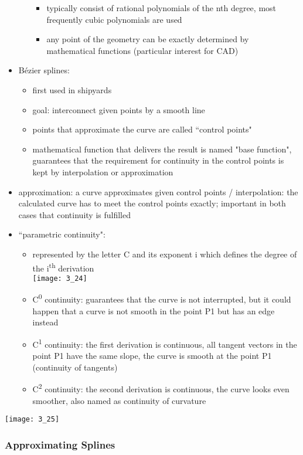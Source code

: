 \documentclass{standalone}
\begin{document}
\begin{itemize}
\begin{itemize}
\begin{itemize}
			\item typically consist of rational polynomials of the nth degree, most frequently cubic polynomials are used
			\item any point of the geometry can be exactly determined by mathematical functions (particular interest for CAD)
		\end{itemize}
	\end{itemize}
	\item B\'ezier splines:
	\begin{itemize}
		\item first used in shipyards
		\item goal: interconnect given points by a smooth line
		\item points that approximate the curve are called ``control points"
		\item mathematical function that delivers the result is named "base function", guarantees that the requirement for continuity in the control points is kept by interpolation or approximation
	\end{itemize}
	\item approximation: a curve approximates given control points / interpolation: the calculated curve has to meet the control points exactly; important in both cases that continuity is fulfilled
	\item ``parametric continuity":
	\begin{itemize}
		\item represented by the letter C and its exponent i which defines the degree of the i\textsuperscript{th} derivation \\
		\texttt{[image: 3\_24]}
		\item C\textsuperscript{0} continuity: guarantees that the curve is not interrupted, but it could happen that a curve is not smooth in the point P1 but has an edge instead
		\item C\textsuperscript{1} continuity: the first derivation is continuous, all tangent vectors in the point P1 have the same slope, the curve is smooth at the point P1 (continuity of tangents)
		\item C\textsuperscript{2} continuity: the second derivation is continuous, the curve looks even smoother, also named as continuity of curvature
	\end{itemize}
\end{itemize}

\texttt{[image: 3\_25]}

\subsubsection*{Approximating Splines}
\end{document}
